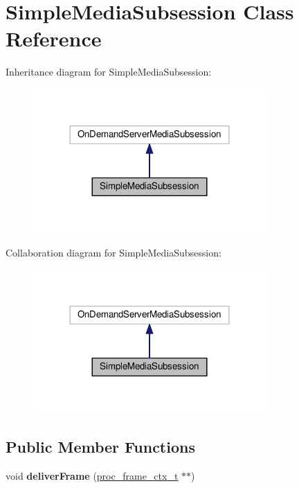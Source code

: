 \hypertarget{classSimpleMediaSubsession}{}\section{Simple\+Media\+Subsession Class Reference}
\label{classSimpleMediaSubsession}


Inheritance diagram for Simple\+Media\+Subsession\+:\nopagebreak
\begin{figure}[H]
\begin{center}
\leavevmode
\includegraphics[width=252pt]{classSimpleMediaSubsession__inherit__graph}
\end{center}
\end{figure}


Collaboration diagram for Simple\+Media\+Subsession\+:\nopagebreak
\begin{figure}[H]
\begin{center}
\leavevmode
\includegraphics[width=252pt]{classSimpleMediaSubsession__coll__graph}
\end{center}
\end{figure}
\subsection*{Public Member Functions}
\begin{DoxyCompactItemize}
\item 
void {\bfseries deliver\+Frame} (\hyperlink{structproc__frame__ctx__s}{proc\+\_\+frame\+\_\+ctx\+\_\+t} $\ast$$\ast$)\hypertarget{classSimpleMediaSubsession_a69d4f42c52f6a045ce862b56a17107d9}{}\label{classSimpleMediaSubsession_a69d4f42c52f6a045ce862b56a17107d9}

\end{DoxyCompactItemize}
